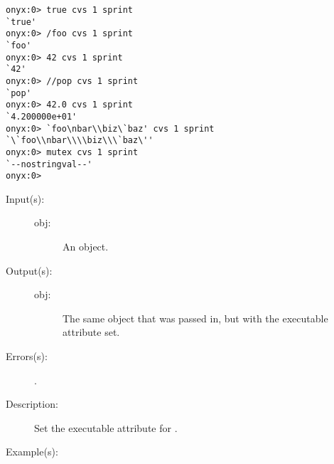 \begin{description}
\begin{description}
\begin{verbatim}
onyx:0> true cvs 1 sprint
`true'
onyx:0> /foo cvs 1 sprint
`foo'
onyx:0> 42 cvs 1 sprint
`42'
onyx:0> //pop cvs 1 sprint
`pop'
onyx:0> 42.0 cvs 1 sprint
`4.200000e+01'
onyx:0> `foo\nbar\\biz\`baz' cvs 1 sprint
`\`foo\\nbar\\\\biz\\\`baz\''
onyx:0> mutex cvs 1 sprint
`--nostringval--'
onyx:0>
		\end{verbatim}
	\end{description}
\label{systemdict:cvx}
\item[{\onyxop{obj}{cvx}{obj}}: ]
	\begin{description}\item[]
	\item[Input(s): ]
		\begin{description}\item[]
		\item[obj: ]
			An object.
		\end{description}
	\item[Output(s): ]
		\begin{description}\item[]
		\item[obj: ]
			The same object that was passed in, but with the
			executable attribute set.
		\end{description}
	\item[Errors(s): ]
		\begin{description}\item[]
		\item[.]
		\end{description}
	\item[Description: ]
		Set the executable attribute for .
	\item[Example(s): ]\begin{verbatim}


\end{verbatim}
\end{description}
\end{description}
